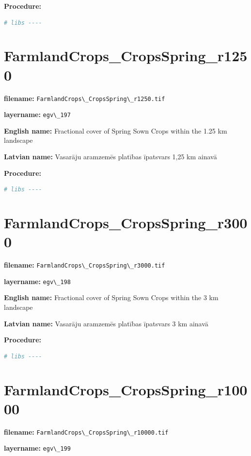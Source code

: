 \documentclass[
]{book}
\newcommand{\passthrough}[1]{#1}
\begin{document}
\textbf{Procedure:}

\begin{lstlisting}[language=R]
# libs ----
\end{lstlisting}

\section{FarmlandCrops\_CropsSpring\_r1250}\label{ch06.197}

\textbf{filename:} \passthrough{\lstinline!FarmlandCrops\_CropsSpring\_r1250.tif!}

\textbf{layername:} \passthrough{\lstinline!egv\_197!}

\textbf{English name:} Fractional cover of Spring Sown Crops within the 1.25 km landscape

\textbf{Latvian name:} Vasarāju aramzemēs platības īpatsvars 1,25 km ainavā

\textbf{Procedure:}

\begin{lstlisting}[language=R]
# libs ----
\end{lstlisting}

\section{FarmlandCrops\_CropsSpring\_r3000}\label{ch06.198}

\textbf{filename:} \passthrough{\lstinline!FarmlandCrops\_CropsSpring\_r3000.tif!}

\textbf{layername:} \passthrough{\lstinline!egv\_198!}

\textbf{English name:} Fractional cover of Spring Sown Crops within the 3 km landscape

\textbf{Latvian name:} Vasarāju aramzemēs platības īpatsvars 3 km ainavā

\textbf{Procedure:}

\begin{lstlisting}[language=R]
# libs ----
\end{lstlisting}

\section{FarmlandCrops\_CropsSpring\_r10000}\label{ch06.199}

\textbf{filename:} \passthrough{\lstinline!FarmlandCrops\_CropsSpring\_r10000.tif!}

\textbf{layername:} \passthrough{\lstinline!egv\_199!}
\end{document}
